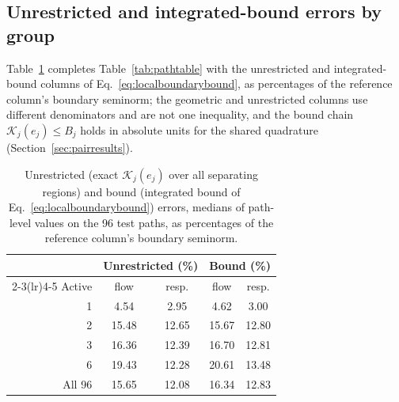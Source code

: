 \subsection{Unrestricted and integrated-bound errors by group}\label{supp:boundchain}
Table~\ref{tab:boundchain96} completes Table~\ref{tab:pathtable} with
the unrestricted and integrated-bound columns of
Eq.~\eqref{eq:localboundarybound}, as percentages of the reference
column's boundary seminorm; the geometric and unrestricted columns use
different denominators and are not one inequality, and the bound chain
$\mathcal K_j(e_j)\le B_j$ holds in absolute units for the shared
quadrature (Section~\ref{sec:pairresults}).
\begin{table}[pos=htbp]\centering\footnotesize
\caption{Unrestricted (exact $\mathcal K_j(e_j)$ over all separating
regions) and bound (integrated bound of
Eq.~\eqref{eq:localboundarybound}) errors, medians of path-level values
on the 96 test paths, as percentages of the reference column's
boundary seminorm.}\label{tab:boundchain96}
\begin{tabular}{rcc cc}\toprule
& \multicolumn{2}{c}{Unrestricted (\%)} & \multicolumn{2}{c}{Bound (\%)}\\
\cmidrule(lr){2-3}\cmidrule(lr){4-5}
Active & flow & resp. & flow & resp.\\\midrule
1 & 4.54 & 2.95 & 4.62 & 3.00\\
2 & 15.48 & 12.65 & 15.67 & 12.80\\
3 & 16.36 & 12.39 & 16.70 & 12.81\\
6 & 19.43 & 12.28 & 20.61 & 13.48\\
\midrule
All 96 & 15.65 & 12.08 & 16.34 & 12.83\\
\bottomrule\end{tabular}\end{table}
